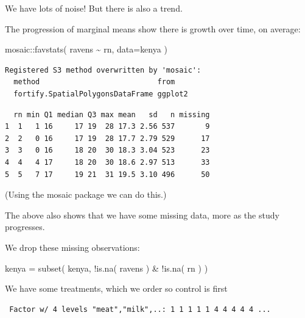 \documentclass[
  letterpaper,
  DIV=11,
  numbers=noendperiod]{scrreprt}
\newenvironment{Shaded}{\begin{snugshade}}{\end{snugshade}}
\newcommand{\AttributeTok}[1]{\textcolor[rgb]{0.49,0.56,0.16}{#1}}
\newcommand{\FunctionTok}[1]{\textcolor[rgb]{0.02,0.16,0.49}{#1}}
\newcommand{\NormalTok}[1]{\textcolor[rgb]{0.00,0.44,0.13}{#1}}
\newcommand{\OtherTok}[1]{\textcolor[rgb]{0.00,0.44,0.13}{#1}}
\newcommand{\SpecialCharTok}[1]{\textcolor[rgb]{0.25,0.44,0.63}{#1}}
\begin{document}
We have lots of noise! But there is also a trend.

The progression of marginal means show there is growth over time, on
average:

\begin{Shaded}
\begin{Highlighting}[]
\NormalTok{mosaic}\SpecialCharTok{::}\FunctionTok{favstats}\NormalTok{( ravens }\SpecialCharTok{\textasciitilde{}}\NormalTok{ rn, }\AttributeTok{data=}\NormalTok{kenya )}
\end{Highlighting}
\end{Shaded}

\begin{verbatim}
Registered S3 method overwritten by 'mosaic':
  method                           from   
  fortify.SpatialPolygonsDataFrame ggplot2
\end{verbatim}

\begin{verbatim}
  rn min Q1 median Q3 max mean   sd   n missing
1  1   1 16     17 19  28 17.3 2.56 537       9
2  2   0 16     17 19  28 17.7 2.79 529      17
3  3   0 16     18 20  30 18.3 3.04 523      23
4  4   4 17     18 20  30 18.6 2.97 513      33
5  5   7 17     19 21  31 19.5 3.10 496      50
\end{verbatim}

(Using the mosaic package we can do this.)

The above also shows that we have some missing data, more as the study
progresses.

We drop these missing observations:

\begin{Shaded}
\begin{Highlighting}[]
\NormalTok{kenya }\OtherTok{=} \FunctionTok{subset}\NormalTok{( kenya, }\SpecialCharTok{!}\FunctionTok{is.na}\NormalTok{( ravens ) }\SpecialCharTok{\&} \SpecialCharTok{!}\FunctionTok{is.na}\NormalTok{( rn ) )}
\end{Highlighting}
\end{Shaded}

We have some treatments, which we order so control is first

\begin{Shaded}
\end{Shaded}

\begin{verbatim}
 Factor w/ 4 levels "meat","milk",..: 1 1 1 1 1 4 4 4 4 4 ...
\end{verbatim}
\end{document}
